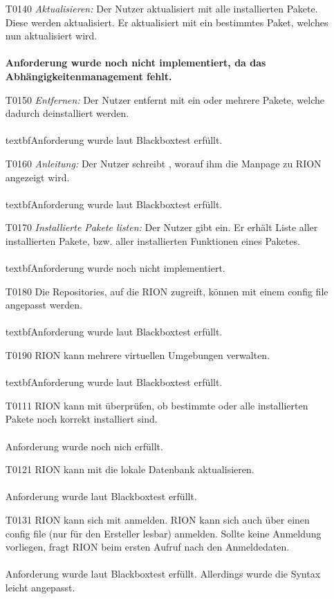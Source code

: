 \begin{itemize}
	\item[T0140] \textit{Aktualisieren:} Der Nutzer aktualisiert mit  alle installierten Pakete. Diese werden aktualisiert. Er aktualisiert mit  ein bestimmtes Paket, welches nun aktualisiert wird.\\\\
	\textbf{Anforderung wurde noch nicht implementiert, da das Abhängigkeitenmanagement fehlt.}
	\item[T0150] \textit{Entfernen:} Der Nutzer entfernt mit  ein oder mehrere Pakete, welche dadurch deinstalliert werden.\\\\
	textbf{Anforderung wurde laut Blackboxtest erfüllt.}
	\item[T0160] \textit{Anleitung:} Der Nutzer schreibt , worauf ihm die Manpage zu RION angezeigt wird.\\\\
		textbf{Anforderung wurde laut Blackboxtest erfüllt.}
	\item[T0170] \textit{Installierte Pakete listen:} Der Nutzer gibt  ein. Er erhält Liste aller installierten Pakete, bzw. aller installierten Funktionen eines Paketes.\\\\
		textbf{Anforderung wurde noch nicht implementiert.}
	\item[T0180] Die Repositories, auf die RION zugreift, können mit einem config file angepasst werden.\\\\
		textbf{Anforderung wurde laut Blackboxtest erfüllt.}
	\item[T0190] RION kann mehrere virtuellen Umgebungen verwalten.\\\\
		textbf{Anforderung wurde laut Blackboxtest erfüllt.}
	\item[T0111] RION kann mit 	 überprüfen, ob bestimmte oder alle installierten Pakete noch korrekt installiert sind.\\\\
		{Anforderung wurde noch nich erfüllt.}
	\item[T0121] RION kann mit  die lokale Datenbank aktualisieren.\\\\
		{Anforderung wurde laut Blackboxtest erfüllt.}
	\item[T0131] RION kann sich mit  anmelden. RION kann sich auch über einen config file (nur für den Ersteller lesbar) anmelden. Sollte keine Anmeldung vorliegen, fragt RION beim ersten Aufruf nach den Anmeldedaten.\\\\
	{Anforderung wurde laut Blackboxtest erfüllt. Allerdings wurde die Syntax leicht angepasst.}
\end{itemize}
